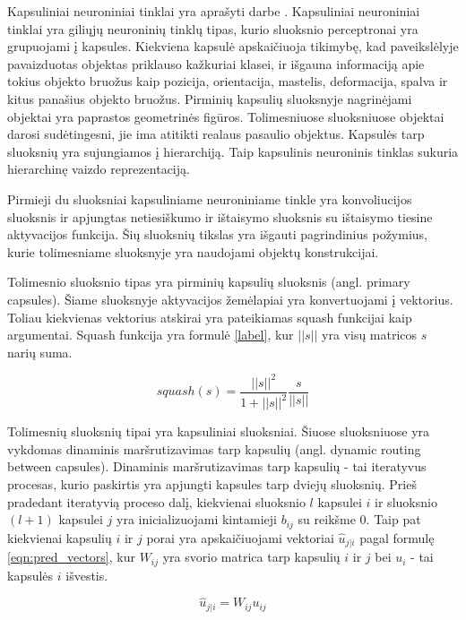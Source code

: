 Kapsuliniai neuroniniai tinklai yra aprašyti darbe \cite{capsNet}. Kapsuliniai neuroniniai tinklai yra giliųjų neuroninių tinklų tipas, kurio sluoksnio perceptronai yra grupuojami į kapsules. Kiekviena kapsulė apskaičiuoja tikimybę, kad paveikslėlyje pavaizduotas objektas priklauso kažkuriai klasei, ir išgauna informaciją apie tokius objekto bruožus kaip pozicija, orientacija, mastelis, deformacija, spalva ir kitus panašius objekto bruožus. Pirminių kapsulių sluoksnyje nagrinėjami objektai yra paprastos geometrinės figūros. Tolimesniuose sluoksniuose objektai darosi sudėtingesni, jie ima atitikti realaus pasaulio objektus. Kapsulės tarp sluoksnių yra sujungiamos į hierarchiją. Taip kapsulinis neuroninis tinklas sukuria hierarchinę vaizdo reprezentaciją.

Pirmieji du sluoksniai kapsuliniame neuroniniame tinkle yra konvoliucijos sluoksnis ir apjungtas netiesiškumo ir ištaisymo sluoksnis su ištaisymo tiesine aktyvacijos funkcija. Šių sluoksnių tikslas yra išgauti pagrindinius požymius, kurie tolimesniame sluoksnyje yra naudojami objektų konstrukcijai.

Tolimesnio sluoksnio tipas yra pirminių kapsulių sluoksnis (angl. primary capsules). Šiame sluoksnyje aktyvacijos žemėlapiai yra konvertuojami į vektorius. Toliau kiekvienas vektorius atskirai yra pateikiamas squash funkcijai kaip argumentai. Squash funkcija yra formulė \ref{label}, kur $||s||$ yra visų matricos $s$ narių suma.

\begin{equation}
\label{eqn:squash}
	squash(s) = \dfrac{||s||^2}{1 + ||s||^2}\dfrac{s}{||s||}
\end{equation}

Tolimesnių sluoksnių tipai yra kapsuliniai sluoksniai. Šiuose sluoksniuose yra vykdomas dinaminis maršrutizavimas tarp kapsulių (angl. dynamic routing between capsules). Dinaminis maršrutizavimas tarp kapsulių - tai iteratyvus procesas, kurio paskirtis yra apjungti kapsules tarp dviejų sluoksnių. Prieš pradedant iteratyvią proceso dalį, kiekvienai sluoksnio $l$ kapsulei $i$ ir sluoksnio $(l + 1)$ kapsulei $j$ yra inicializuojami kintamieji $b_{ij}$ su reikšme 0. Taip pat kiekvienai kapsulių $i$ ir $j$ porai yra apskaičiuojami vektoriai $\hat{u}_{j|i}$ pagal formulę \ref{eqn:pred_vectors}, kur $W_{ij}$ yra svorio matrica tarp kapsulių $i$ ir $j$ bei $u_{i}$ - tai kapsulės $i$ išvestis.

\begin{equation}
\label{eqn:pred_vectors}
	\hat{u}_{j|i} = W_{ij} u_{ij}
\end{equation}

